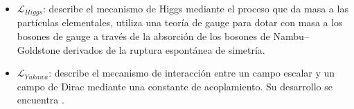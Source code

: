 \begin{itemize}
\item $\mathcal{L}_{Higgs}$: describe el mecanismo de Higgs mediante el proceso que da masa a las partículas elementales, utiliza una teoría de gauge para dotar con masa a los bosones de gauge a través de la absorción de los bosones de Nambu–Goldstone derivados de la ruptura espontánea de simetría. %
\item $\mathcal{L}_{Yukawa}$: describe el mecanismo de interacción entre un campo escalar y un campo de Dirac mediante una constante de acoplamiento. Su desarrollo se encuentra \citep{santamaria_masses_1993, romao_resource_2012}.



\end{itemize}

